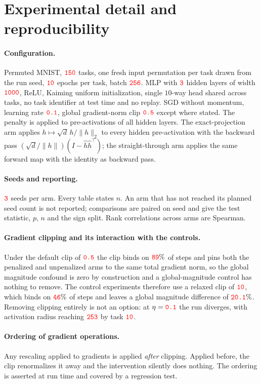 \documentclass[anon]{opt2026}     %
\newcommand{\PH}[1]{\textcolor{red}{\texttt{#1}}}   %
\begin{document}
\section{Experimental detail and reproducibility}
\label{app:setup}

\paragraph{Configuration.} Permuted MNIST, $\PH{150}$ tasks, one fresh input
permutation per task drawn from the run seed, $\PH{10}$ epochs per task, batch
$\PH{256}$. MLP with $\PH{3}$ hidden layers of width $\PH{1000}$, ReLU, Kaiming
uniform initialization, single $10$-way head shared across tasks, no task
identifier at test time and no replay. SGD without momentum, learning rate
$\PH{0.1}$, global gradient-norm clip $\PH{0.5}$ except where stated. The penalty
is applied to pre-activations of all hidden layers. The exact-projection arm
applies $h \mapsto \sqrt d\, h/\|h\|_2$ to every hidden pre-activation with the
backward pass $(\sqrt d/\|h\|)(I - \hat h \hat h^\top)$; the straight-through
arm applies the same forward map with the identity as backward pass.

\paragraph{Seeds and reporting.} $\PH{3}$ seeds per arm. Every table states $n$.
An arm that has not reached its planned seed count is not reported; comparisons
are paired on seed and give the test statistic, $p$, $n$ and the sign split.
Rank correlations across arms are Spearman.

\paragraph{Gradient clipping and its interaction with the controls.} Under the
default clip of $\PH{0.5}$ the clip binds on $\PH{89}\%$ of steps and pins both
the penalized and unpenalized arms to the same total gradient norm, so the global
magnitude confound is zero by construction and a global-magnitude control has
nothing to remove. The control experiments therefore use a relaxed clip of
$\PH{10}$, which binds on $\PH{46}\%$ of steps and leaves a global magnitude
difference of $\PH{20.1}\%$. Removing clipping entirely is not an option: at
$\eta = \PH{0.1}$ the run diverges, with activation radius reaching $\PH{253}$ by
task $\PH{10}$.

\paragraph{Ordering of gradient operations.} Any rescaling applied to gradients is
applied \emph{after} clipping. Applied before, the clip renormalizes it away and
the intervention silently does nothing. The ordering is asserted at run time and
covered by a regression test.
\end{document}

